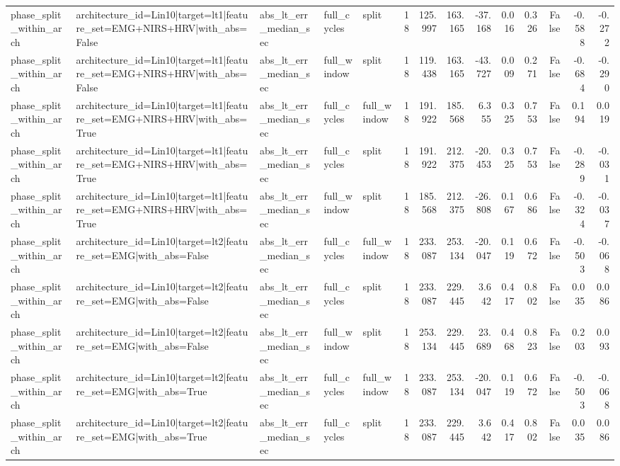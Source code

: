\begin{table}
\begin{tabular}{lllllrrrrrrrrr}
phase_split_within_arch & architecture_id=Lin10|target=lt1|feature_set=EMG+NIRS+HRV|with_abs=False & abs_lt_err_median_sec & full_cycles & split & 18 & 125.997 & 163.165 & -37.168 & 0.016 & 0.326 & False & -0.588 & -0.272 \\
phase_split_within_arch & architecture_id=Lin10|target=lt1|feature_set=EMG+NIRS+HRV|with_abs=False & abs_lt_err_median_sec & full_window & split & 18 & 119.438 & 163.165 & -43.727 & 0.009 & 0.271 & False & -0.684 & -0.290 \\
phase_split_within_arch & architecture_id=Lin10|target=lt1|feature_set=EMG+NIRS+HRV|with_abs=True & abs_lt_err_median_sec & full_cycles & full_window & 18 & 191.922 & 185.568 & 6.355 & 0.325 & 0.753 & False & 0.194 & 0.019 \\
phase_split_within_arch & architecture_id=Lin10|target=lt1|feature_set=EMG+NIRS+HRV|with_abs=True & abs_lt_err_median_sec & full_cycles & split & 18 & 191.922 & 212.375 & -20.453 & 0.325 & 0.753 & False & -0.289 & -0.031 \\
phase_split_within_arch & architecture_id=Lin10|target=lt1|feature_set=EMG+NIRS+HRV|with_abs=True & abs_lt_err_median_sec & full_window & split & 18 & 185.568 & 212.375 & -26.808 & 0.167 & 0.686 & False & -0.324 & -0.037 \\
phase_split_within_arch & architecture_id=Lin10|target=lt2|feature_set=EMG|with_abs=False & abs_lt_err_median_sec & full_cycles & full_window & 18 & 233.087 & 253.134 & -20.047 & 0.119 & 0.672 & False & -0.503 & -0.068 \\
phase_split_within_arch & architecture_id=Lin10|target=lt2|feature_set=EMG|with_abs=False & abs_lt_err_median_sec & full_cycles & split & 18 & 233.087 & 229.445 & 3.642 & 0.417 & 0.802 & False & 0.035 & 0.086 \\
phase_split_within_arch & architecture_id=Lin10|target=lt2|feature_set=EMG|with_abs=False & abs_lt_err_median_sec & full_window & split & 18 & 253.134 & 229.445 & 23.689 & 0.468 & 0.823 & False & 0.203 & 0.093 \\
phase_split_within_arch & architecture_id=Lin10|target=lt2|feature_set=EMG|with_abs=True & abs_lt_err_median_sec & full_cycles & full_window & 18 & 233.087 & 253.134 & -20.047 & 0.119 & 0.672 & False & -0.503 & -0.068 \\
phase_split_within_arch & architecture_id=Lin10|target=lt2|feature_set=EMG|with_abs=True & abs_lt_err_median_sec & full_cycles & split & 18 & 233.087 & 229.445 & 3.642 & 0.417 & 0.802 & False & 0.035 & 0.086 \\

\end{tabular}
\end{table}
